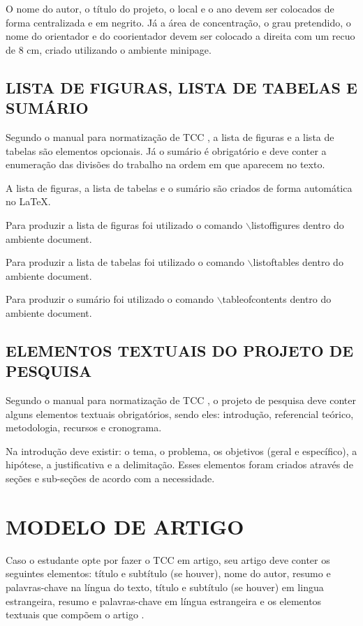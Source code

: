 O nome do autor, o título do projeto, o local e o ano devem ser colocados de forma centralizada e em negrito. Já a área de concentração, o grau pretendido, o nome do orientador e do coorientador devem ser colocado a direita com um recuo de 8 cm, criado utilizando o ambiente minipage.

\subsection{LISTA DE FIGURAS, LISTA DE TABELAS E SUMÁRIO}
Segundo o manual para normatização de TCC \cite{manualTCC}, a lista de figuras e a lista de tabelas são elementos opcionais. Já o sumário é obrigatório e deve conter a enumeração das divisões do trabalho na ordem em que aparecem no texto.

A lista de figuras, a lista de tabelas e o sumário são criados de forma automática no LaTeX.

Para produzir a lista de figuras foi utilizado o comando $\backslash$listoffigures dentro do ambiente document.

Para produzir a lista de tabelas foi utilizado o comando $\backslash$listoftables dentro do ambiente document.

Para produzir o sumário foi utilizado o comando $\backslash$tableofcontents dentro do ambiente document.

\subsection{ELEMENTOS TEXTUAIS DO PROJETO DE PESQUISA}
Segundo o manual para normatização de TCC \cite{manualTCC}, o projeto de pesquisa deve conter alguns elementos textuais obrigatórios, sendo eles: introdução, referencial teórico, metodologia, recursos e cronograma.

Na introdução deve existir: o tema, o problema, os objetivos (geral e específico), a hipótese, a justificativa e a delimitação. Esses elementos foram criados através de seções e sub-seções de acordo com a necessidade.

\newpage
\section{MODELO DE ARTIGO}
\indent Caso o estudante opte por fazer o TCC em artigo, seu artigo deve conter os seguintes elementos: título e subtítulo (se houver), nome do autor, resumo e palavras-chave na língua do texto, título e subtítulo (se houver) em lingua estrangeira, resumo e palavras-chave em língua estrangeira e os elementos textuais que compõem o artigo \cite{manualTCC}.

